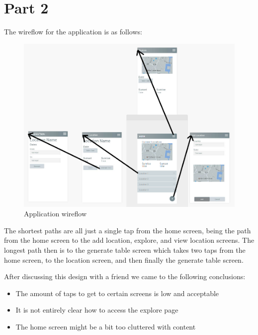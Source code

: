\documentclass{scrartcl}
\begin{document}
\section*{Part 2}
The wireflow for the application is as follows:
\begin{figure}[h]
    \centering
    \includegraphics[scale=0.5]{images/wireflow.png}
    \caption{Application wireflow}
\end{figure}

The shortest paths are all just a single tap from the home screen, being the path from
the home screen to the add location, explore, and view location screens. The longest path
then is to the generate table screen which takes two taps from the home screen, to the
location screen, and then finally the generate table screen.

\bigskip

After discussing this design with a friend we came to the following conclusions:
\begin{itemize}
    \item The amount of taps to get to certain screens is low and acceptable
    \item It is not entirely clear how to access the explore page
    \item The home screen might be a bit too cluttered with content
\end{itemize}
\end{document}
